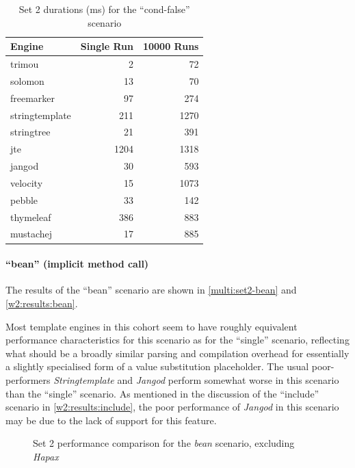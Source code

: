 \begin{table}[!p]
\centering
\begin{tabular}{lrr}
\textbf{Engine} & \textbf{Single Run} & \textbf{10000 Runs} \\
\hline
trimou & 2 & 72 \\
solomon & 13 & 70 \\
freemarker & 97 & 274 \\
stringtemplate & 211 & 1270 \\
stringtree & 21 & 391 \\
jte & 1204 & 1318 \\
jangod & 30 & 593 \\
velocity & 15 & 1073 \\
pebble & 33 & 142 \\
thymeleaf & 386 & 883 \\
mustachej & 17 & 885 \\
\end{tabular}
\caption{Set 2 durations (ms) for the \enquote{cond-false} scenario\label{w2:results:cond-false}}
\end{table}

\paragraph{\enquote{bean} (implicit method call)}

The results of the \enquote{bean} scenario are shown in \autoref{multi:set2-bean} and \autoref{w2:results:bean}.

Most \gls{template engine}s in this cohort seem to have roughly equivalent performance characteristics for this scenario as for the \enquote{single} scenario, reflecting what should be a broadly similar parsing and compilation overhead for essentially a slightly specialised form of a value substitution placeholder. The usual poor-performers \emph{Stringtemplate} and \emph{Jangod} perform somewhat worse in this scenario than the \enquote{single} scenario. As mentioned in the discussion of the \enquote{include} scenario in \autoref{w2:results:include}, the poor performance of \emph{Jangod} in this scenario may be due to the lack of support for this feature.

\begin{figure}[!p]
\centering

\caption{\label{multi:set2-bean}Set 2 performance comparison for the \emph{bean} scenario, excluding \emph{Hapax}}
\end{figure}

